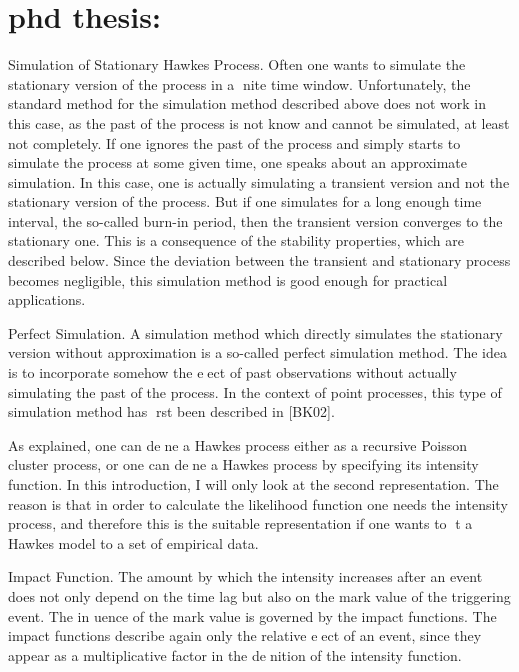 \documentclass[11pt]{book}
\begin{document}
\frontmatter
\pagestyle{front}

\mainmatter
\pagestyle{main}









\section{phd thesis:}





Simulation of Stationary Hawkes Process. Often one wants to simulate
the stationary version of the process in a nite time window. Unfortunately,
the standard method for the simulation method described above does not work
in this case, as the past of the process is not know and cannot be simulated,
at least not completely.
If one ignores the past of the process and simply starts to simulate the
process at some given time, one speaks about an approximate simulation. In
this case, one is actually simulating a transient version and not the stationary
version of the process. But if one simulates for a long enough time interval, the
so-called burn-in period, then the transient version converges to the stationary
one. This is a consequence of the stability properties, which are described below.
Since the deviation between the transient and stationary process becomes
negligible, this simulation method is good enough for practical applications.

Perfect Simulation. A simulation method which directly simulates the stationary
version without approximation is a so-called perfect simulation method.
The idea is to incorporate somehow the eect of past observations without actually
simulating the past of the process. In the context of point processes, this
type of simulation method has rst been described in [BK02].




As explained, one can dene a Hawkes process
either as a recursive Poisson cluster process, or one can dene a Hawkes process
by specifying its intensity function. In this introduction, I will only look at the
second representation. The reason is that in order to calculate the likelihood
function one needs the intensity process, and therefore this is the suitable
representation if one wants to t a Hawkes model to a set of empirical data.



Impact Function. The amount by which the intensity increases after an
event does not only depend on the time lag but also on the mark value of
the triggering event. The in
uence of the mark value is governed by the impact
functions. The impact functions describe again only the relative eect of
an event, since they appear as a multiplicative factor in the denition of the
intensity function.
\end{document}
